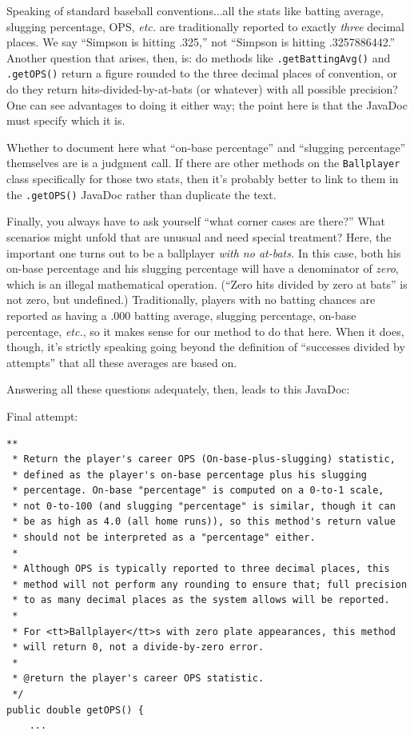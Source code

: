 \label{batting average}
Speaking of standard baseball conventions...all the stats like batting
average, slugging percentage, OPS, \textit{etc.} are traditionally reported to
exactly \textit{three} decimal places. We say ``Simpson is hitting .325,'' not
``Simpson is hitting .3257886442.'' Another question that arises, then, is: do
methods like \texttt{.getBattingAvg()} and \texttt{.getOPS()} return a figure
rounded to the three decimal places of convention, or do they return
hits-divided-by-at-bats (or whatever) with all possible precision? One can see
advantages to doing it either way; the point here is that the JavaDoc must
specify which it is.

Whether to document here what ``on-base percentage'' and ``slugging percentage''
themselves are is a judgment call. If there are other methods on the
\texttt{Ballplayer} class specifically for those two stats, then it's probably
better to link to them in the \texttt{.getOPS()} JavaDoc rather than duplicate
the text.

\label{corner case}
Finally, you always have to ask yourself ``what corner cases are there?'' What
scenarios might unfold that are unusual and need special treatment? Here, the
important one turns out to be a ballplayer \textit{with no at-bats.} In this
case, both his on-base percentage and his slugging percentage will have a
denominator of \textit{zero}, which is an illegal mathematical operation.
(``Zero hits divided by zero at bats'' is not zero, but undefined.)
Traditionally, players with no batting chances are reported as having a .000
batting average, slugging percentage, on-base percentage, \textit{etc.}, so it
makes sense for our method to do that here. When it does, though, it's
strictly speaking going beyond the definition of ``successes divided by
attempts'' that all these averages are based on.

Answering all these questions adequately, then, leads to this JavaDoc:

Final attempt:
\vspace{-.15in}
\begin{Verbatim}[fontsize=\scriptsize,samepage=true,frame=single]
**
 * Return the player's career OPS (On-base-plus-slugging) statistic,
 * defined as the player's on-base percentage plus his slugging 
 * percentage. On-base "percentage" is computed on a 0-to-1 scale,
 * not 0-to-100 (and slugging "percentage" is similar, though it can
 * be as high as 4.0 (all home runs)), so this method's return value
 * should not be interpreted as a "percentage" either.
 * 
 * Although OPS is typically reported to three decimal places, this
 * method will not perform any rounding to ensure that; full precision
 * to as many decimal places as the system allows will be reported.
 *
 * For <tt>Ballplayer</tt>s with zero plate appearances, this method
 * will return 0, not a divide-by-zero error.
 *
 * @return the player's career OPS statistic.
 */
public double getOPS() {
    ...
\end{Verbatim}

